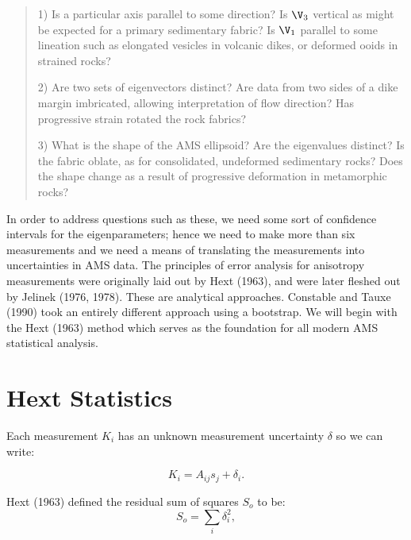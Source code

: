 \begin {quote}
1)  Is a particular axis parallel to some direction? 
Is $\V_3$  vertical as might be expected for a primary sedimentary fabric?
Is $\V_1$ parallel to some lineation such as elongated
vesicles in volcanic dikes, or deformed ooids in strained rocks?

2) Are two sets of eigenvectors distinct?  Are data
from two sides of a dike margin imbricated, allowing interpretation of
flow direction? Has progressive strain rotated the rock fabrics?

3) What is the shape of the AMS ellipsoid? Are the eigenvalues distinct?
Is the fabric oblate, as for  consolidated, undeformed sedimentary rocks?  Does the shape
change as a result of progressive deformation in metamorphic rocks? 

\end{quote}


In order to address questions such as these,
 we need some sort of confidence intervals
for the eigenparameters; hence we need to make 
more than six measurements and we need a 
means of translating the measurements into uncertainties in AMS data.  
The principles of error analysis for anisotropy measurements were originally
laid out by
  Hext (1963),   \nocite{hext63}  and were later fleshed out by 
  Jelinek (1976, 1978).  \nocite{jelinek76} \nocite{jelinek78}  These are analytical approaches.  
Constable and Tauxe (1990) \nocite{constable90}
took an entirely different approach using a bootstrap.  We will begin with the 
Hext (1963) \nocite{hext63}
method which serves as the foundation for all modern AMS statistical analysis.  

\section{Hext Statistics}
\label{sect:hext}

Each measurement $K_i$ has an unknown
measurement uncertainty $\delta$ so we can write:  

\begin{equation}
K_i = A_{ij}s_j + \delta_i.
\label{eq:kdel}
\end{equation}

\noindent
Hext (1963) defined  the residual sum of squares $S_o$ to be:
\begin{equation}
S_o= \sum_i \delta_i^2 , 
\label{eq:So}
\end{equation}

